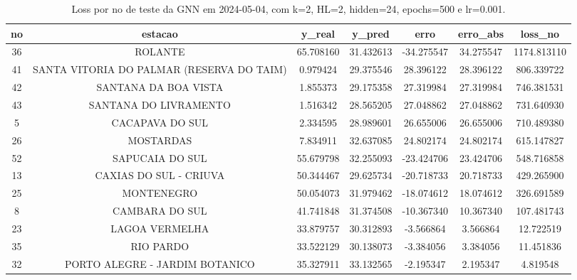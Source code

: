\begin{table}[h]
\centering
\caption{Loss por no de teste da GNN em 2024-05-04, com k=2, HL=2, hidden=24, epochs=500 e lr=0.001.}
\label{tab:gnn_loss_k2_hl2_h24_e500_d20240504}
\begin{tabular}{ccccccc}
\toprule
no & estacao & y\_real & y\_pred & erro & erro\_abs & loss\_no \\
\midrule
36 & ROLANTE & 65.708160 & 31.432613 & -34.275547 & 34.275547 & 1174.813110 \\
41 & SANTA VITORIA DO PALMAR (RESERVA DO TAIM) & 0.979424 & 29.375546 & 28.396122 & 28.396122 & 806.339722 \\
42 & SANTANA DA BOA VISTA & 1.855373 & 29.175358 & 27.319984 & 27.319984 & 746.381531 \\
43 & SANTANA DO LIVRAMENTO & 1.516342 & 28.565205 & 27.048862 & 27.048862 & 731.640930 \\
5 & CACAPAVA DO SUL & 2.334595 & 28.989601 & 26.655006 & 26.655006 & 710.489380 \\
26 & MOSTARDAS & 7.834911 & 32.637085 & 24.802174 & 24.802174 & 615.147827 \\
52 & SAPUCAIA DO SUL & 55.679798 & 32.255093 & -23.424706 & 23.424706 & 548.716858 \\
13 & CAXIAS DO SUL - CRIUVA & 50.344467 & 29.625734 & -20.718733 & 20.718733 & 429.265900 \\
25 & MONTENEGRO & 50.054073 & 31.979462 & -18.074612 & 18.074612 & 326.691589 \\
8 & CAMBARA DO SUL & 41.741848 & 31.374508 & -10.367340 & 10.367340 & 107.481743 \\
23 & LAGOA VERMELHA & 33.879757 & 30.312893 & -3.566864 & 3.566864 & 12.722519 \\
35 & RIO PARDO & 33.522129 & 30.138073 & -3.384056 & 3.384056 & 11.451836 \\
32 & PORTO ALEGRE - JARDIM BOTANICO & 35.327911 & 33.132565 & -2.195347 & 2.195347 & 4.819548 \\
\bottomrule
\end{tabular}
\end{table}
